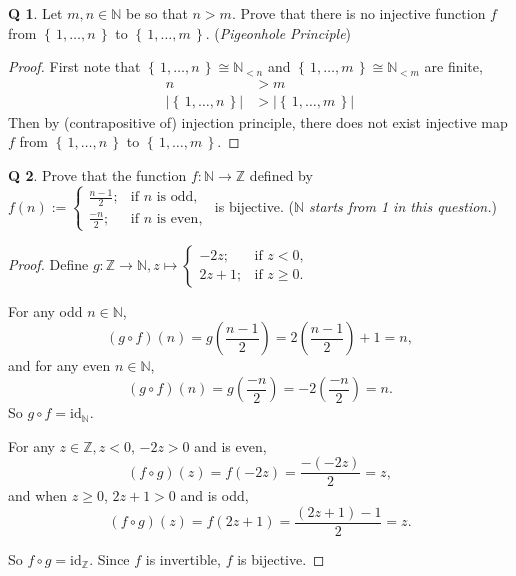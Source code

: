 \documentclass[12pt]{article}
\newcommand{\set}[1]{\left\{\,#1\,\right\}}
\theoremstyle{definition}
\newtheorem{qn}{Q}
\numberwithin{equation}{qn}
\numberwithin{lemma}{qn}
\newcommand{\nat}{\mathbb{N}}
\newcommand{\Int}{\mathbb{Z}}
\newcommand{\idmap}{\mathrm{id}}
\renewcommand{\geq}{\geqslant}
\begin{document}
\begin{qn}
    Let $m,n\in\nat$ be so that $n > m$.
    Prove that there is no injective function $f$ from $\set{1,\dots,n}$ to $\set{1,\dots,m}$.
    (\emph{Pigeonhole Principle})
\end{qn}
\begin{proof}
    First note that $\set{1,\dots,n}\cong \nat_{<n}$ and $\set{1,\dots,m}\cong \nat_{<m}$ are finite,
    \begin{align*}
        n &> m\\
        \left|\set{1,\dots,n}\right| &> \left|\set{1,\dots,m}\right|
    \end{align*}
    Then by (contrapositive of) injection principle,
    there does not exist injective map $f$ from $\set{1,\dots,n}$ to $\set{1,\dots,m}$.
\end{proof}

\begin{qn}
    Prove that the function $f:\nat \rightarrow \Int$ defined by
    $f(n) :=
    \begin{cases}
        \frac{n-1}{2};  &\mbox{if } n \text{ is odd},\\
        \frac{-n}{2};  &\mbox{if } n \text{ is even},
    \end{cases}
    $ is bijective.
    (\emph{$\nat$ starts from 1 in this question.})
\end{qn}
\begin{proof}
Define $g:\Int \rightarrow \nat,
    z \mapsto
    \begin{cases}
        -2z; &\mbox{if } z < 0,\\
        2z + 1; &\mbox{if } z \geq 0.
    \end{cases}$

    For any odd $n\in\nat$,
    \[
        (g\circ f)(n) = g\left(\frac{n-1}{2}\right)
                      = 2\left(\frac{n-1}{2}\right) + 1 = n,
    \]
    and for any even $n\in\nat$,
    \[
        (g\circ f)(n) = g\left(\frac{-n}{2}\right)
                      = -2\left(\frac{-n}{2}\right)    = n.
    \]
    So $g\circ f = \idmap_{\nat}$.

    For any $z \in \Int, z < 0$, $-2z > 0$ and is even,
    \[
        (f\circ g)(z) = f(-2z)
                      = \frac{-(-2z)}{2} = z,
    \]
    and when $z \geq 0$, $2z+1 > 0$ and is odd,
    \[
        (f\circ g)(z) = f(2z + 1)
                      = \frac{(2z + 1) - 1}{2} = z.
    \]
\item So $f\circ g = \idmap_{\Int}$. Since $f$ is invertible, $f$ is bijective.
\end{proof}
\end{document}

